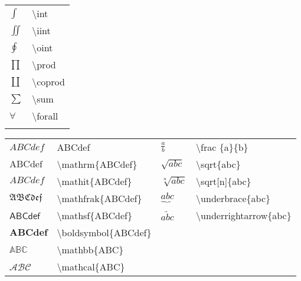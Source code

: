 \documentclass[14pt,a4paper]{extarticle}
\begin{document}
\begin{table}
\begin{subtable}{.24\textwidth}
\begin{tabular}{ p{1em} p{9em}  }
      \\ 
    \end{tabular}
  \end{subtable}
  \begin{subtable}{.24\textwidth}
    \begin{tabular}{ p{1em} p{9em}  }

      $\int$ & \textbackslash int \\
      $\iint$ & \textbackslash iint \\
      $\oint$ & \textbackslash oint \\
      $\prod$ & \textbackslash prod \\
      $\coprod$ & \textbackslash coprod \\
      $\sum$ & \textbackslash sum \\
      $\forall$ & \textbackslash forall \\
      \\ 

    \end{tabular}
  \end{subtable}
\end{table}
\begin{table}
  \centering
    \begin{tabular}{ p{5em} p{12em} p{5em} p{12em} }
      $ABCdef$ & ABCdef &
      $\frac{a}{b}$ & \textbackslash frac \{a\}\{b\} \\
      $\mathrm{ABCdef}$ & \textbackslash mathrm\{ABCdef\} &
      $\sqrt{abc}$ & \textbackslash sqrt\{abc\} \\
      $\mathit{ABCdef}$ & \textbackslash mathit\{ABCdef\} &
      $\sqrt[n]{abc}$ & \textbackslash sqrt[n]\{abc\} \\
      $\mathfrak{ABCdef}$ & \textbackslash mathfrak\{ABCdef\} &
      $\underbrace{abc}$ & \textbackslash underbrace\{abc\} \\
      $\mathsf{ABCdef}$ & \textbackslash mathsf\{ABCdef\} &
      $\underrightarrow{abc}$ & \textbackslash underrightarrow\{abc\} \\
      $\boldsymbol{ABCdef}$ & \textbackslash boldsymbol\{ABCdef\} \\
      $\mathbb{ABC}$ & \textbackslash mathbb\{ABC\} \\
      $\mathcal{ABC}$ & \textbackslash mathcal\{ABC\} \\

   \end{tabular}
\end{table}
\end{document}
